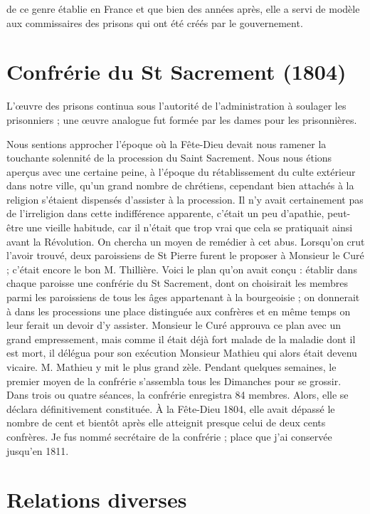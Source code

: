 \documentclass[11pt,a4paper]{report}
\begin{document}
de ce genre établie en France et que bien des années après, elle a servi de modèle aux commissaires des prisons qui ont été créés par le gouvernement.

\section*{Confrérie du St Sacrement (1804)}

L'œuvre des prisons continua sous l'autorité de l'administration à soulager les prisonniers ; une œuvre analogue fut formée par les dames pour les prisonnières.

Nous sentions approcher l'époque où la Fête-Dieu devait nous ramener la touchante solennité de la procession du Saint Sacrement. Nous nous étions aperçus avec une certaine peine, à l'époque du rétablissement du culte extérieur dans notre ville, qu'un grand nombre de chrétiens, cependant bien attachés à la religion s'étaient dispensés d'assister à la procession. Il n'y avait certainement pas de l'irreligion dans cette indifférence apparente, c'était un peu d'apathie, peut-être une vieille habitude, car il n'était que trop vrai que cela se pratiquait ainsi avant la Révolution. On chercha un moyen de remédier à cet abus. Lorsqu'on crut l'avoir trouvé, deux paroissiens de St Pierre furent le proposer à Monsieur le Curé ; c'était encore le bon M. Thillière. Voici le plan qu'on avait conçu : établir dans chaque paroisse une confrérie du St Sacrement, dont on choisirait les membres parmi les paroissiens de tous les âges appartenant à la bourgeoisie ; on donnerait à dans les processions une place distinguée aux confrères et en même temps on leur ferait un devoir d'y assister. Monsieur le Curé approuva ce plan avec un grand empressement, mais comme il était déjà fort malade de la maladie dont il est mort, il délégua pour son exécution Monsieur Mathieu qui alors était devenu vicaire. M. Mathieu y mit le plus grand zèle. Pendant quelques semaines, le premier moyen de la confrérie s'assembla tous les Dimanches pour se grossir. Dans trois ou quatre séances, la confrérie enregistra 84 membres. Alors, elle se déclara définitivement constituée. À la Fête-Dieu 1804, elle avait dépassé le nombre de cent et bientôt après elle atteignit presque celui de deux cents confrères. Je fus nommé secrétaire de la confrérie ; place que j'ai conservée jusqu'en 1811.

\section*{Relations diverses}
\end{document}
